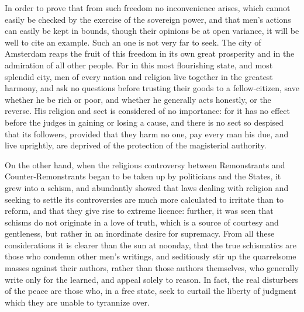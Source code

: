 In order to prove that from such freedom no inconvenience arises,
which cannot easily be checked by the exercise of the sovereign power,
and that men's actions can easily be kept in bounds, though their
opinions be at open variance, it will be well to cite an example. Such
an one is not very far to seek. The city of Amsterdam reaps the fruit
of this freedom in its own great prosperity and in the admiration of
all other people. For in this most flourishing state, and most
splendid city, men of every nation and religion live together in the
greatest harmony, and ask no questions before trusting their goods to
a fellow-citizen, save whether he be rich or poor, and whether he
generally acts honestly, or the reverse. His religion and sect is
considered of no importance: for it has no effect before the judges in
gaining or losing a cause, and there is no sect so despised that its
followers, provided that they harm no one, pay every man his due, and
live uprightly, are deprived of the protection of the magisterial
authority.

On the other hand, when the religious controversy between Remonstrants
and Counter-Remonstrants began to be taken up by politicians and the
States, it grew into a schism, and abundantly showed that laws dealing
with religion and seeking to settle its controversies are much more
calculated to irritate than to reform, and that they give rise to
extreme licence: further, it was seen that schisms do not originate in
a love of truth, which is a source of courtesy and gentleness, but
rather in an inordinate desire for supremacy. From all these
considerations it is clearer than the sun at noonday, that the true
schismatics are those who condemn other men's writings, and
seditiously stir up the quarrelsome masses against their authors,
rather than those authors themselves, who generally write only for the
learned, and appeal solely to reason. In fact, the real disturbers of
the peace are those who, in a free state, seek to curtail the liberty
of judgment which they are unable to tyrannize over.

